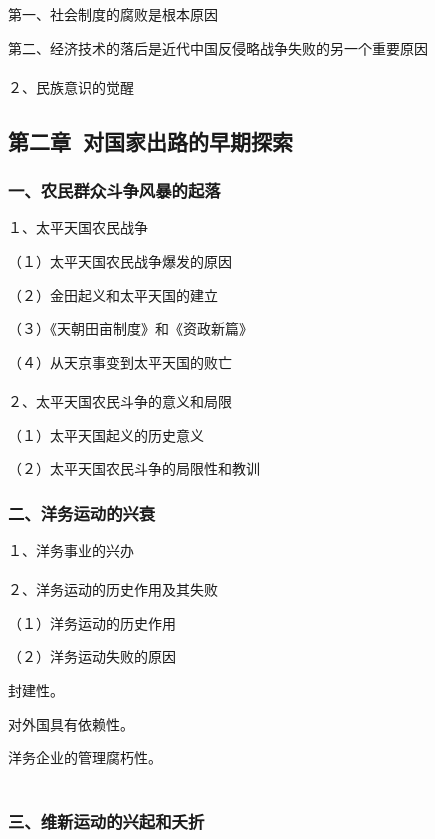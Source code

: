 \documentclass{ctexart}
\begin{document}
第一、社会制度的腐败是根本原因

第二、经济技术的落后是近代中国反侵略战争失败的另一个重要原因
\\\\

２、民族意识的觉醒



\subsection{第二章\ 对国家出路的早期探索}

\subsubsection{一、农民群众斗争风暴的起落}

１、太平天国农民战争

（１）太平天国农民战争爆发的原因

（２）金田起义和太平天国的建立

（３）《天朝田亩制度》和《资政新篇》

（４）从天京事变到太平天国的败亡
\\\\


２、太平天国农民斗争的意义和局限

（１）太平天国起义的历史意义

（２）太平天国农民斗争的局限性和教训

\subsubsection{二、洋务运动的兴衰}

１、洋务事业的兴办　
\\\\


２、洋务运动的历史作用及其失败

（１）洋务运动的历史作用

（２）洋务运动失败的原因

封建性。

对外国具有依赖性。

洋务企业的管理腐朽性。
\\\\


\subsubsection{三、维新运动的兴起和夭折}
\end{document}
